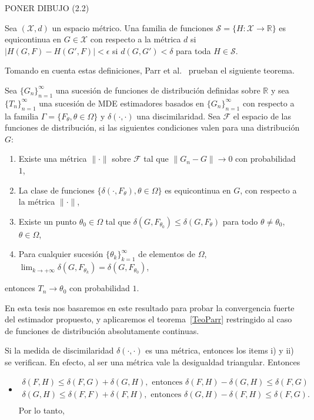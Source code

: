 PONER DIBUJO (2.2)

\begin{definition}
	Sea $(\mathcal{X},d)$ un espacio métrico. Una familia de funciones $\mathcal{S}=\{H:\mathcal{X}\longrightarrow\mathbb{R}\}$ es equicontinua en $G \in \mathcal{X}$ con respecto a la métrica $d$ si $\mid H(G,F) - H(G',F)\mid < \epsilon $ si $d(G,G') < \delta$ para toda $H \in \mathcal{S}.$
\end{definition}

Tomando en cuenta estas definiciones, Parr et al.~\cite{parr1982} prueban el siguiente teorema.
\begin{theorem}
	\label{TeoParr}
	Sea $\{G_n\}_{n=1}^{\infty}$ una sucesión de funciones de distribución definidas sobre $\mathbb{R}$ y sea $\{T_n\}_{n=1}^{\infty}$ una sucesión de MDE estimadores basados en $\{G_n\}_{n=1}^{\infty}$ con respecto a la familia $\Gamma=\{F_{\theta},\theta \in \Omega\}$ y $\delta(\cdot,\cdot)$ una discimilaridad. Sea $\mathcal{F}$ el espacio de las funciones de distribución, si las siguientes condiciones valen para una distribución $G$:
	\begin{enumerate}
		\item Existe una métrica $\parallel \cdot \parallel$ sobre $\mathcal{F}$ tal que $\parallel G_n - G \parallel \longrightarrow 0$ con probabilidad $1$,
		\item La clase de funciones $\{\delta(\cdot,F_{\theta}), \theta \in \Omega\}$ es equicontinua en $G$, con respecto a la métrica $\parallel \cdot \parallel$,
		\item Existe un punto $\theta_0 \in \Omega$ tal que $\delta(G,F_{\theta_0}) \leq \delta(G,F_{\theta})$ para todo $\theta \neq \theta_0$, $\theta \in \Omega$,
		\item Para cualquier sucesión $\{\theta_k\}_{k=1}^{\infty}$ de elementos de $\Omega$, $\lim_{k \to+\infty} \delta(G,F_{\theta_k})=\delta(G,F_{\theta_0})$,
	\end{enumerate}
entonces $T_n \longrightarrow \theta_0$ con probabilidad $1$.
\end{theorem}

En esta tesis nos basaremos en este resultado para probar la convergencia fuerte del estimador propuesto, y aplicaremos el teorema~\ref{TeoParr} restringido al caso de funciones de distribución absolutamente continuas. 

\begin{remark}
	Si la medida de discimilaridad $\delta(\cdot,\cdot)$ es una métrica, entonces los items i) y ii) se verifican. En efecto, al ser una métrica vale la desigualdad triangular. Entonces
	\begin{itemize}
		\item
	\begin{align}
	\delta(F,H) \leq \delta(F,G) + \delta(G,H), \text{ entonces } \delta(F,H)-\delta(G,H)\leq \delta(F,G)\\
	\delta(G,H) \leq \delta(F,F) + \delta(F,H), \text{ entonces } \delta(G,H)-\delta(F,H)\leq \delta(F,G).\\
	\end{align}
	Por lo tanto, 
	\end{itemize}
\end{remark}
